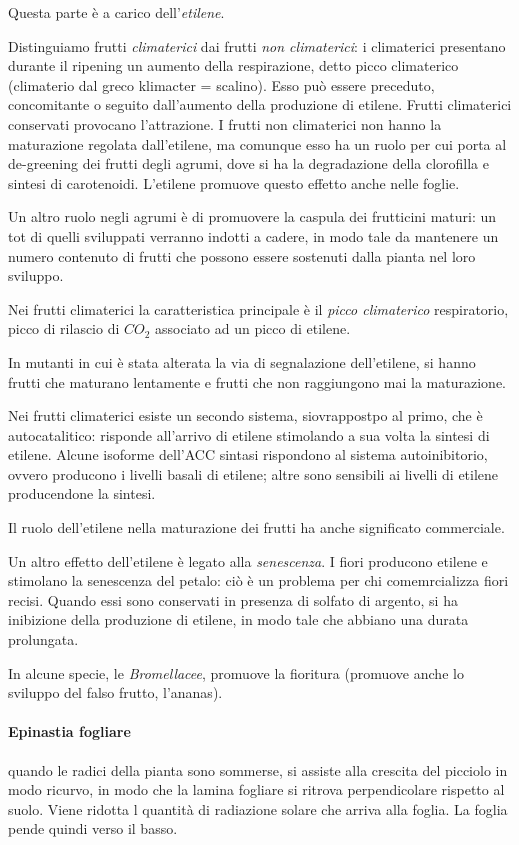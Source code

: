 \documentclass[a4paper,12pt]{book}
\begin{document}
Questa parte è a carico dell'\emph{etilene}.

Distinguiamo frutti \emph{ climaterici} dai frutti \emph{non climaterici}: i climaterici presentano durante il ripening un aumento della respirazione, detto picco climaterico
(climaterio dal greco klimacter = scalino). Esso può essere preceduto, concomitante o seguito
dall’aumento della produzione di etilene. Frutti climaterici conservati provocano l'attrazione. I frutti non climaterici non hanno la maturazione regolata dall'etilene, ma comunque esso ha un ruolo per cui porta al de-greening dei frutti degli agrumi, dove si ha la degradazione della clorofilla e sintesi di carotenoidi. L'etilene promuove questo effetto anche nelle foglie.

Un altro ruolo negli agrumi è di promuovere la caspula dei frutticini maturi: un tot di quelli sviluppati verranno indotti a cadere, in modo tale da mantenere un numero contenuto di frutti che possono essere sostenuti dalla pianta nel loro sviluppo.

Nei frutti climaterici la caratteristica principale è il \emph{picco climaterico} respiratorio, picco di rilascio di $CO_{2}$ associato ad un picco di etilene.  

In mutanti in cui è stata alterata la via di segnalazione dell'etilene, si hanno frutti che maturano lentamente e frutti che non raggiungono mai la maturazione.

Nei frutti climaterici esiste un secondo sistema, siovrappostpo al primo, che è autocatalitico: risponde all'arrivo di etilene stimolando a sua volta la sintesi di etilene. Alcune isoforme dell'ACC sintasi rispondono al sistema autoinibitorio, ovvero producono i livelli basali di etilene; altre sono sensibili ai livelli di etilene producendone la sintesi. 

Il ruolo dell'etilene nella maturazione dei frutti ha anche significato commerciale. 

Un altro effetto dell'etilene è legato alla \emph{senescenza}. I fiori producono etilene e stimolano la senescenza del petalo: ciò è un problema per chi comemrcializza fiori recisi. Quando essi sono conservati in presenza di solfato di argento, si ha inibizione della produzione di etilene, in modo tale che abbiano una durata prolungata.

In alcune specie, le \emph{Bromellacee}, promuove la fioritura (promuove anche lo sviluppo del falso frutto, l'ananas).

\paragraph{Epinastia fogliare} quando le radici della pianta sono sommerse, si assiste alla crescita del picciolo in modo ricurvo, in modo che la lamina fogliare si ritrova perpendicolare rispetto al suolo. Viene ridotta l quantità di radiazione solare che arriva alla foglia. La foglia pende quindi verso il basso.
\end{document}
